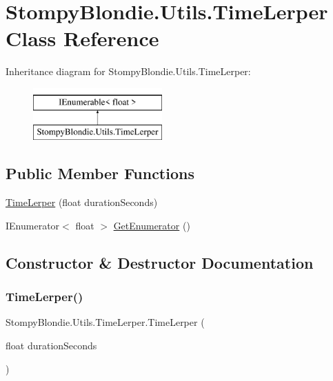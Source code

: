 \hypertarget{class_stompy_blondie_1_1_utils_1_1_time_lerper}{}\section{Stompy\+Blondie.\+Utils.\+Time\+Lerper Class Reference}
\label{class_stompy_blondie_1_1_utils_1_1_time_lerper}
Inheritance diagram for Stompy\+Blondie.\+Utils.\+Time\+Lerper\+:\begin{figure}[H]
\begin{center}
\leavevmode
\includegraphics[height=2.000000cm]{class_stompy_blondie_1_1_utils_1_1_time_lerper}
\end{center}
\end{figure}
\subsection*{Public Member Functions}
\begin{DoxyCompactItemize}
\item 
\mbox{\hyperlink{class_stompy_blondie_1_1_utils_1_1_time_lerper_a921b38718ec7717d1aa4ba43e932a067}{Time\+Lerper}} (float duration\+Seconds)
\item 
I\+Enumerator$<$ float $>$ \mbox{\hyperlink{class_stompy_blondie_1_1_utils_1_1_time_lerper_a94f254b4f590804aaa2acbb2f6fb51c9}{Get\+Enumerator}} ()
\end{DoxyCompactItemize}


\subsection{Constructor \& Destructor Documentation}
\mbox{\label{class_stompy_blondie_1_1_utils_1_1_time_lerper_a921b38718ec7717d1aa4ba43e932a067}} 
\subsubsection{\texorpdfstring{Time\+Lerper()}{TimeLerper()}}
{\footnotesize\ttfamily Stompy\+Blondie.\+Utils.\+Time\+Lerper.\+Time\+Lerper (\begin{DoxyParamCaption}\item[{float}]{duration\+Seconds }\end{DoxyParamCaption})\hspace{0.3cm}{\ttfamily [inline]}}



